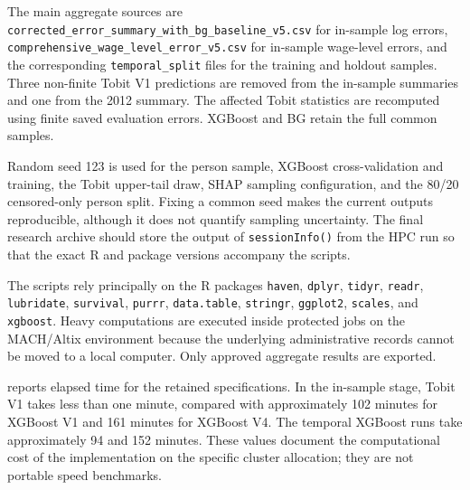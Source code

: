 \documentclass[12pt,a4paper,oneside,titlepage]{book}
\begin{document}
The main aggregate sources are \texttt{corrected\_error\_summary\_with\_bg\_baseline\_v5.csv} for in-sample log errors, \texttt{comprehensive\_wage\_level\_error\_v5.csv} for in-sample wage-level errors, and the corresponding \texttt{temporal\_split} files for the training and holdout samples. Three non-finite Tobit V1 predictions are removed from the in-sample summaries and one from the 2012 summary. The affected Tobit statistics are recomputed using finite saved evaluation errors. XGBoost and BG retain the full common samples.

Random seed 123 is used for the person sample, XGBoost cross-validation and training, the Tobit upper-tail draw, SHAP sampling configuration, and the 80/20 censored-only person split. Fixing a common seed makes the current outputs reproducible, although it does not quantify sampling uncertainty. The final research archive should store the output of \texttt{sessionInfo()} from the HPC run so that the exact R and package versions accompany the scripts.

The scripts rely principally on the R packages \texttt{haven}, \texttt{dplyr}, \texttt{tidyr}, \texttt{readr}, \texttt{lubridate}, \texttt{survival}, \texttt{purrr}, \texttt{data.table}, \texttt{stringr}, \texttt{ggplot2}, \texttt{scales}, and \texttt{xgboost}. Heavy computations are executed inside protected jobs on the MACH/Altix environment because the underlying administrative records cannot be moved to a local computer. Only approved aggregate results are exported.

 reports elapsed time for the retained specifications. In the in-sample stage, Tobit V1 takes less than one minute, compared with approximately 102 minutes for XGBoost V1 and 161 minutes for XGBoost V4. The temporal XGBoost runs take approximately 94 and 152 minutes. These values document the computational cost of the implementation on the specific cluster allocation; they are not portable speed benchmarks.



\backmatter
\end{document}
